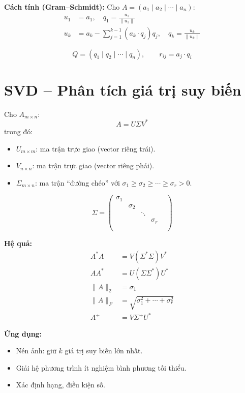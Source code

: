 \textbf{Cách tính (Gram--Schmidt):}
Cho $A = (a_1 \mid a_2 \mid \cdots \mid a_n)$:
\begin{align}
u_1 &= a_1, \quad q_1 = \frac{u_1}{\|u_1\|} \\
u_k &= a_k - \sum_{j=1}^{k-1} (a_k \cdot q_j) q_j, \quad q_k = \frac{u_k}{\|u_k\|}
\end{align}

\[
Q = (q_1 \mid q_2 \mid \cdots \mid q_n), \qquad r_{ij} = a_j \cdot q_i
\]

\section{SVD -- Phân tích giá trị suy biến}

Cho $A_{m \times n}$:
\[
A = U\Sigma V^*
\]
trong đó:
\begin{itemize}
    \item $U_{m \times m}$: ma trận trực giao (vector riêng trái).
    \item $V_{n \times n}$: ma trận trực giao (vector riêng phải).
    \item $\Sigma_{m \times n}$: ma trận ``đường chéo'' với $\sigma_1 \ge \sigma_2 \ge \cdots \ge \sigma_r > 0$.
\end{itemize}

\[
\Sigma = \begin{pmatrix}
\sigma_1 & & & \\
& \sigma_2 & & \\
& & \ddots & \\
& & & \sigma_r \\
& & & & \\
\end{pmatrix}
\]

\textbf{Hệ quả:}
\begin{align}
A^*A &= V(\Sigma^*\Sigma) V^* \\
AA^* &= U(\Sigma\Sigma^*) U^* \\
\|A\|_2 &= \sigma_1 \\
\|A\|_F &= \sqrt{\sigma_1^2 + \cdots + \sigma_r^2} \\
A^+ &= V\Sigma^+ U^*
\end{align}

\textbf{Ứng dụng:}
\begin{itemize}
    \item Nén ảnh: giữ $k$ giá trị suy biến lớn nhất.
    \item Giải hệ phương trình ít nghiệm bình phương tối thiểu.
    \item Xác định hạng, điều kiện số.
\end{itemize}

